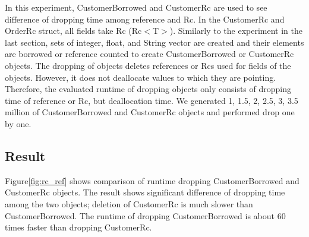 

In this experiment, CustomerBorrowed and CustomerRc are used to see difference of dropping time among reference and Rc. 
In the CustomerRc and OrderRc struct, all fields take Rc (Rc$<$T$>$). Similarly to the experiment in the last section, 
sets of integer, float, and String vector are created and their elements are borrowed or reference counted to create CustomerBorrowed or CustomerRc objects.
The dropping of objects deletes references or Rcs used for fields of the objects. However, it does not deallocate values to which they are pointing. 
Therefore, the evaluated runtime of dropping objects only consists of dropping time of reference or Rc, but deallocation time.
We generated 1, 1.5, 2, 2.5, 3, 3.5 million of CustomerBorrowed and CustomerRc objects and performed drop one by one. 

\subsection{Result}
Figure\ref{fig:rc_ref} shows comparison of runtime dropping CustomerBorrowed and CustomerRc objects. 
The result shows significant difference of dropping time among the two objects; deletion of CustomerRc is much slower than CustomerBorrowed. 
The runtime of dropping CustomerBorrowed is about 60 times faster than dropping CustomerRc. 

